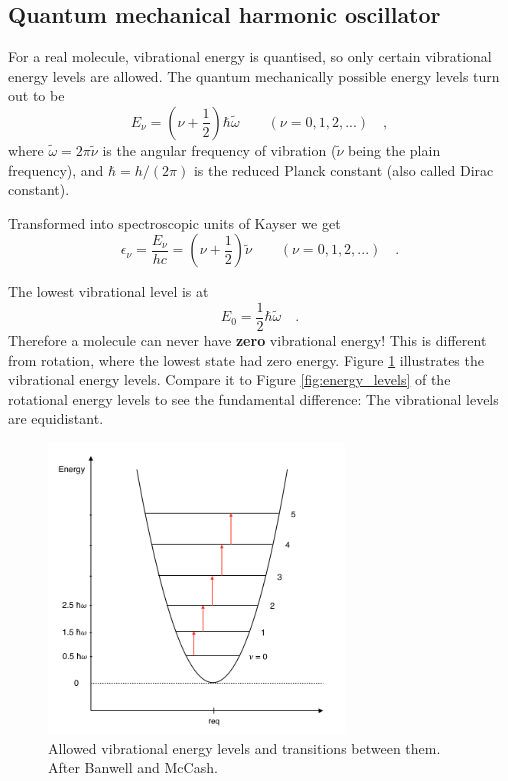 \subsection{Quantum mechanical harmonic oscillator} 
For a real molecule, vibrational energy is quantised, so only certain
vibrational energy levels are allowed. The quantum mechanically possible energy levels turn out to be 
\begin{equation}
E_\nu = (\nu+\frac{1}{2})\hbar\tilde{\omega} \qquad (\nu = 0, 1, 2, ...) \quad ,
\end{equation}
where $\tilde{\omega} = 2 \pi \tilde{\nu}$ is the angular frequency of
vibration ($\tilde{\nu}$ being the plain frequency), and $\hbar =
h/(2\pi)$ is the reduced Planck constant (also called Dirac constant).

Transformed into spectroscopic units of Kayser we get
\begin{equation}
\epsilon_\nu = \frac{E_\nu}{hc} = (\nu + \frac{1}{2})\tilde{\nu} \qquad (\nu = 0, 1, 2, ...) \quad .
\end{equation}

The lowest vibrational level is at
\begin{equation}
E_0 = \frac{1}{2} \hbar \tilde{\omega} \quad .
\end{equation}
Therefore a molecule can never have \textbf{zero} vibrational energy!
This is different from rotation, where the lowest state had zero
energy. Figure \ref{Vibration_parabol_2} illustrates the vibrational
energy levels. Compare it to Figure \ref{fig:energy_levels} of the
rotational energy levels to see the fundamental difference: The
vibrational levels are equidistant.

\begin{figure}
\begin{center}
\includegraphics[width=0.7\textwidth]{figures/Vibration_parabol_2}
\caption{Allowed vibrational energy levels and transitions between them. After Banwell and McCash.}
\label{Vibration_parabol_2}
\end{center}
\end{figure}

